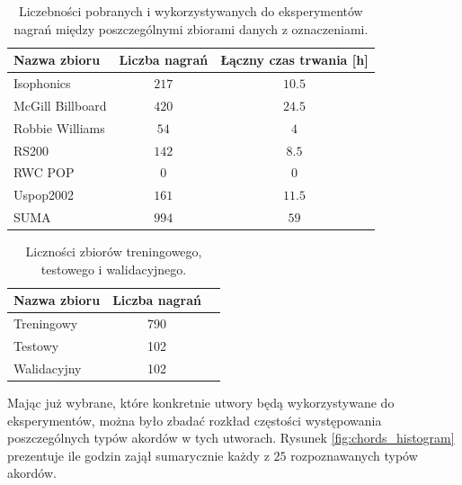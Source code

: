 \begin{table}
    \centering
    \caption{Liczebności pobranych i wykorzystywanych do eksperymentów nagrań między poszczególnymi zbiorami danych z oznaczeniami.}
    \label{tab:datasets2}
    \begin{tabular}{|l|c|c|}
        \hline
        Nazwa zbioru & Liczba nagrań & Łączny czas trwania [h] \\
        \hline
        Isophonics          & $217$ & $10.5$ \\ %
        McGill Billboard    & $420$ & $24.5$ \\ %
        Robbie Williams     & $54$  & $4$    \\ %
        RS200               & $142$ & $8.5$  \\ %
        RWC POP             & $0$   & $0$    \\
        Uspop2002           & $161$ & $11.5$ \\ %
        \hline
        SUMA                & $994$ & $59$   \\
        \hline
    \end{tabular}
\end{table}

\begin{table}
    \centering
    \caption{Liczności zbiorów treningowego, testowego i walidacyjnego.}
    \label{tab:datasets3}
    \begin{tabular}{|l|c|c|}
        \hline
        Nazwa zbioru & Liczba nagrań \\
        \hline
        Treningowy  & 790 \\
        Testowy     & 102 \\
        Walidacyjny & 102 \\
        \hline
    \end{tabular}
\end{table}

Mając już wybrane, które konkretnie utwory będą wykorzystywane do eksperymentów, można było zbadać
rozkład częstości występowania poszczególnych typów akordów w tych utworach. Rysunek
\ref{fig:chords_histogram} prezentuje ile godzin zajął sumarycznie każdy z $25$ rozpoznawanych typów
akordów.

